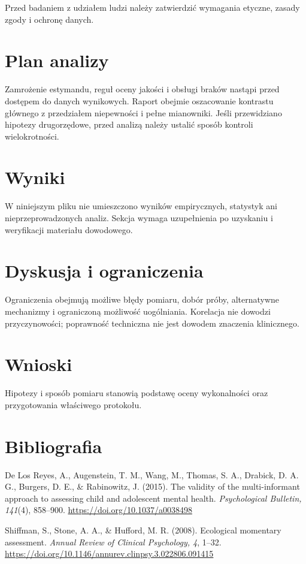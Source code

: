 \documentclass[11pt,a4paper]{article}
\begin{document}
Przed badaniem z udziałem ludzi należy zatwierdzić wymagania etyczne, zasady zgody i ochronę danych.

\section{Plan analizy}

Zamrożenie estymandu, reguł oceny jakości i obsługi braków nastąpi przed dostępem do danych wynikowych. Raport obejmie oszacowanie kontrastu głównego z przedziałem niepewności i pełne mianowniki. Jeśli przewidziano hipotezy drugorzędowe, przed analizą należy ustalić sposób kontroli wielokrotności.

\section{Wyniki}

W niniejszym pliku nie umieszczono wyników empirycznych, statystyk ani nieprzeprowadzonych analiz. Sekcja wymaga uzupełnienia po uzyskaniu i weryfikacji materiału dowodowego.

\section{Dyskusja i ograniczenia}

Ograniczenia obejmują możliwe błędy pomiaru, dobór próby, alternatywne mechanizmy i ograniczoną możliwość uogólniania. Korelacja nie dowodzi przyczynowości; poprawność techniczna nie jest dowodem znaczenia klinicznego.

\section{Wnioski}

Hipotezy i sposób pomiaru stanowią podstawę oceny wykonalności oraz przygotowania właściwego protokołu.

\section*{Bibliografia}

{\setlength{\parindent}{0pt}
\setlength{\parskip}{5pt}
\hangindent=1.27cm
De Los Reyes, A., Augenstein, T. M., Wang, M., Thomas, S. A., Drabick, D. A. G., Burgers, D. E., \& Rabinowitz, J. (2015). The validity of the multi-informant approach to assessing child and adolescent mental health. \textit{Psychological Bulletin, 141}(4), 858--900. \url{https://doi.org/10.1037/a0038498}\par
\hangindent=1.27cm
Shiffman, S., Stone, A. A., \& Hufford, M. R. (2008). Ecological momentary assessment. \textit{Annual Review of Clinical Psychology, 4}, 1--32. \url{https://doi.org/10.1146/annurev.clinpsy.3.022806.091415}\par
}
\end{document}
